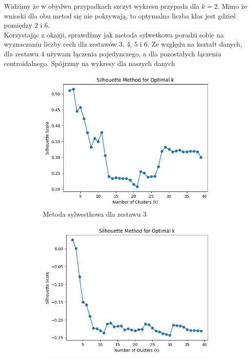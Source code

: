 \documentclass[polish,12pt,a4paper]{extarticle}
\begin{document}
\noindent Widzimy że w obydwu przypadkach szczyt wykresu przypada dla $k = 2$. Mimo że wnioski dla obu metod się nie pokrywają, to optymalna liczba klas jest gdzieś pomiędzy $2$ i $6$. \smallskip \\
Korzystając z okazji, sprawdźmy jak metoda sylwetkowa poradzi sobie na wyznaczaniu liczby cech dla zestawów 3, 4, 5 i 6. Ze względu na kształt danych, dla zestawu $4$ używam łączenia pojedynczego, a dla pozostałych łączenia centroidalnego. Spójrzmy na wykresy dla naszych danych


\begin{figure}[h!]
    \centering
    \begin{subfigure}[b]{0.30\textwidth}
        \includegraphics[width=\linewidth]{img/silhouette3.png}
        \captionsetup{labelformat=empty}
        \centering\caption{Metoda sylwestkowa dla zestawu 3}
    \end{subfigure}
    \hspace{}
    \begin{subfigure}[b]{0.30\textwidth}
        \includegraphics[width=\linewidth]{img/silhouette4.png}

\end{subfigure}
\end{figure}
\end{document}
